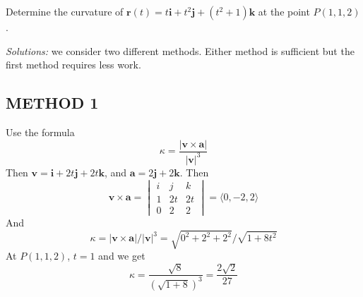 \fi




\ifnum {}
\question[6] Determine the curvature of $\mathbf r(t) = t \mathbf i + t^2 \mathbf j + (t^2+1) \mathbf k$ at the point $P(1,1,2)$.

\ifnum {} {\color{DarkBlue} \textit{Solutions:} we consider two different methods. Either method is sufficient but the first method requires less work. 

    \subsection*{METHOD 1} 
    Use the formula
    $$\kappa = \frac{|\mathbf v \times \mathbf a|}{|\mathbf v|^3}$$
    Then $\mathbf v = \mathbf i +2t\mathbf j + 2t\mathbf k$, and $\mathbf a = 2\mathbf j+2\mathbf k$. Then $$\mathbf v \times \mathbf a = \begin{vmatrix} i&j&k\\ 1&2t&2t \\0&2&2 \end{vmatrix} = \langle 0,-2,2 \rangle $$ And $$\kappa = |\mathbf v \times \mathbf a| / |\mathbf v|^3 = \sqrt{0^2+2^2 +2^2} / \sqrt{1+8t^2}$$ At $P(1,1,2)$, $t=1$ and we get $$\kappa = \frac{\sqrt{8}}{\left(\sqrt{1+8}\right) ^3} = \frac{2\sqrt2}{27}$$
}
